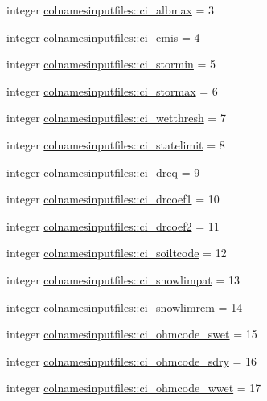 \begin{DoxyCompactItemize}
\item 
integer \hyperlink{namespacecolnamesinputfiles_a573484a89e964235e17ae21b8fbea499}{colnamesinputfiles\+::ci\+\_\+albmax} = 3
\item 
integer \hyperlink{namespacecolnamesinputfiles_a1359ce05f67a356edfb639bcf6e5031b}{colnamesinputfiles\+::ci\+\_\+emis} = 4
\item 
integer \hyperlink{namespacecolnamesinputfiles_af7cb4615904fedf637c4334138af6310}{colnamesinputfiles\+::ci\+\_\+stormin} = 5
\item 
integer \hyperlink{namespacecolnamesinputfiles_a2424fca1c17546928c24b46c5469d261}{colnamesinputfiles\+::ci\+\_\+stormax} = 6
\item 
integer \hyperlink{namespacecolnamesinputfiles_af0008ac036ba147383062dec2ade17af}{colnamesinputfiles\+::ci\+\_\+wetthresh} = 7
\item 
integer \hyperlink{namespacecolnamesinputfiles_aff71fdcb640704a6ec1a7931417cf3cf}{colnamesinputfiles\+::ci\+\_\+statelimit} = 8
\item 
integer \hyperlink{namespacecolnamesinputfiles_a5e12cb1fe7d90fe5fa48c25c829202cb}{colnamesinputfiles\+::ci\+\_\+dreq} = 9
\item 
integer \hyperlink{namespacecolnamesinputfiles_adcf82346df376a809e080d0363fc4a87}{colnamesinputfiles\+::ci\+\_\+drcoef1} = 10
\item 
integer \hyperlink{namespacecolnamesinputfiles_acf63a0051e57c26036b890c525d7e99c}{colnamesinputfiles\+::ci\+\_\+drcoef2} = 11
\item 
integer \hyperlink{namespacecolnamesinputfiles_a2042a989056f7623004717542ff037d8}{colnamesinputfiles\+::ci\+\_\+soiltcode} = 12
\item 
integer \hyperlink{namespacecolnamesinputfiles_ab1c12541bcccc9353623fabff4a91d03}{colnamesinputfiles\+::ci\+\_\+snowlimpat} = 13
\item 
integer \hyperlink{namespacecolnamesinputfiles_ac0a61cb76247bffcbe0170dc9f89a4f5}{colnamesinputfiles\+::ci\+\_\+snowlimrem} = 14
\item 
integer \hyperlink{namespacecolnamesinputfiles_a343a0b3e17205259dfd194ad71de4f57}{colnamesinputfiles\+::ci\+\_\+ohmcode\+\_\+swet} = 15
\item 
integer \hyperlink{namespacecolnamesinputfiles_ad5b0b592418fbd15f3a77fef9385728e}{colnamesinputfiles\+::ci\+\_\+ohmcode\+\_\+sdry} = 16
\item 
integer \hyperlink{namespacecolnamesinputfiles_a7fadeb3f54b31cc1fb7ed6612ebf4336}{colnamesinputfiles\+::ci\+\_\+ohmcode\+\_\+wwet} = 17

\end{DoxyCompactItemize}

